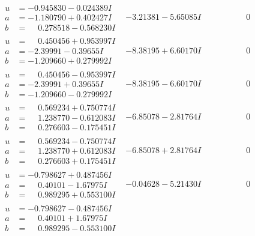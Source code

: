\documentclass[1p]{elsarticle_modified}
\theoremstyle{definition}
\begin{document}
$$\begin{array}{c|c|c}
\begin{aligned}
u &= -0.945830 - 0.024389 I \\
a &= -1.180790 + 0.402427 I \\
b &= \phantom{-}0.278518 - 0.568230 I\end{aligned}
 & -3.21381 - 5.65085 I & \phantom{-0.000000 } 0 \\ \hline\begin{aligned}
u &= \phantom{-}0.450456 + 0.953997 I \\
a &= -2.39991 - 0.39655 I \\
b &= -1.209660 + 0.279992 I\end{aligned}
 & -8.38195 + 6.60170 I & \phantom{-0.000000 } 0 \\ \hline\begin{aligned}
u &= \phantom{-}0.450456 - 0.953997 I \\
a &= -2.39991 + 0.39655 I \\
b &= -1.209660 - 0.279992 I\end{aligned}
 & -8.38195 - 6.60170 I & \phantom{-0.000000 } 0 \\ \hline\begin{aligned}
u &= \phantom{-}0.569234 + 0.750774 I \\
a &= \phantom{-}1.238770 - 0.612083 I \\
b &= \phantom{-}0.276603 - 0.175451 I\end{aligned}
 & -6.85078 - 2.81764 I & \phantom{-0.000000 } 0 \\ \hline\begin{aligned}
u &= \phantom{-}0.569234 - 0.750774 I \\
a &= \phantom{-}1.238770 + 0.612083 I \\
b &= \phantom{-}0.276603 + 0.175451 I\end{aligned}
 & -6.85078 + 2.81764 I & \phantom{-0.000000 } 0 \\ \hline\begin{aligned}
u &= -0.798627 + 0.487456 I \\
a &= \phantom{-}0.40101 - 1.67975 I \\
b &= \phantom{-}0.989295 + 0.553100 I\end{aligned}
 & -0.04628 - 5.21430 I & \phantom{-0.000000 } 0 \\ \hline\begin{aligned}
u &= -0.798627 - 0.487456 I \\
a &= \phantom{-}0.40101 + 1.67975 I \\
b &= \phantom{-}0.989295 - 0.553100 I\end{aligned}

\end{array}$$
\end{document}
